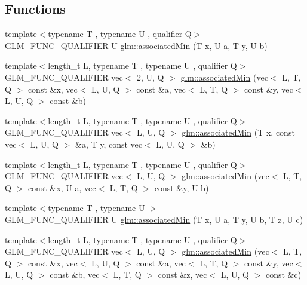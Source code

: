 \subsection*{Functions}
\begin{DoxyCompactItemize}
\item 
{\footnotesize template$<$typename T , typename U , qualifier Q$>$ }\\G\+L\+M\+\_\+\+F\+U\+N\+C\+\_\+\+Q\+U\+A\+L\+I\+F\+I\+ER U \hyperlink{group__gtx__associated__min__max_gacc01bd272359572fc28437ae214a02df}{glm\+::associated\+Min} (T x, U a, T y, U b)
\item 
{\footnotesize template$<$length\+\_\+t L, typename T , typename U , qualifier Q$>$ }\\G\+L\+M\+\_\+\+F\+U\+N\+C\+\_\+\+Q\+U\+A\+L\+I\+F\+I\+ER vec$<$ 2, U, Q $>$ \hyperlink{group__gtx__associated__min__max_gac2f0dff90948f2e44386a5eafd941d1c}{glm\+::associated\+Min} (vec$<$ L, T, Q $>$ const \&x, vec$<$ L, U, Q $>$ const \&a, vec$<$ L, T, Q $>$ const \&y, vec$<$ L, U, Q $>$ const \&b)
\item 
{\footnotesize template$<$length\+\_\+t L, typename T , typename U , qualifier Q$>$ }\\G\+L\+M\+\_\+\+F\+U\+N\+C\+\_\+\+Q\+U\+A\+L\+I\+F\+I\+ER vec$<$ L, U, Q $>$ \hyperlink{group__gtx__associated__min__max_gacfec519c820331d023ef53a511749319}{glm\+::associated\+Min} (T x, const vec$<$ L, U, Q $>$ \&a, T y, const vec$<$ L, U, Q $>$ \&b)
\item 
{\footnotesize template$<$length\+\_\+t L, typename T , typename U , qualifier Q$>$ }\\G\+L\+M\+\_\+\+F\+U\+N\+C\+\_\+\+Q\+U\+A\+L\+I\+F\+I\+ER vec$<$ L, U, Q $>$ \hyperlink{group__gtx__associated__min__max_ga4757c7cab2d809124a8525d0a9deeb37}{glm\+::associated\+Min} (vec$<$ L, T, Q $>$ const \&x, U a, vec$<$ L, T, Q $>$ const \&y, U b)
\item 
{\footnotesize template$<$typename T , typename U $>$ }\\G\+L\+M\+\_\+\+F\+U\+N\+C\+\_\+\+Q\+U\+A\+L\+I\+F\+I\+ER U \hyperlink{group__gtx__associated__min__max_gad0aa8f86259a26d839d34a3577a923fc}{glm\+::associated\+Min} (T x, U a, T y, U b, T z, U c)
\item 
{\footnotesize template$<$length\+\_\+t L, typename T , typename U , qualifier Q$>$ }\\G\+L\+M\+\_\+\+F\+U\+N\+C\+\_\+\+Q\+U\+A\+L\+I\+F\+I\+ER vec$<$ L, U, Q $>$ \hyperlink{group__gtx__associated__min__max_ga723e5411cebc7ffbd5c81ffeec61127d}{glm\+::associated\+Min} (vec$<$ L, T, Q $>$ const \&x, vec$<$ L, U, Q $>$ const \&a, vec$<$ L, T, Q $>$ const \&y, vec$<$ L, U, Q $>$ const \&b, vec$<$ L, T, Q $>$ const \&z, vec$<$ L, U, Q $>$ const \&c)

\end{DoxyCompactItemize}
